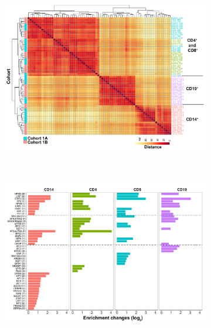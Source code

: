 \bigskip
\begin{figure}[H]
\centering
\begin{subfigure}[b]{0.5\textwidth}
\centering 
\includegraphics[width=\textwidth]{./Results2/pdfs/ATAC_all_cell_types_heatmap_with_batch_annotation}
\caption{}
\end{subfigure}
~
\begin{subfigure}[b]{0.6\textwidth} 
\centering
\includegraphics[width=\textwidth]{./Results2/pdfs/ATAC_PS_CTL_cell_type_specific_master_list_conserved_TFBS_enrichment}
\caption{}
\end{subfigure}

\end{figure}
